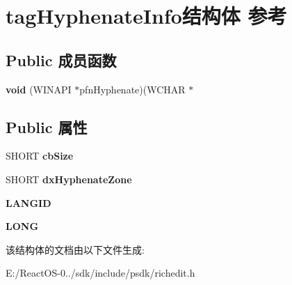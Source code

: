 \hypertarget{structtag_hyphenate_info}{}\section{tag\+Hyphenate\+Info结构体 参考}
\label{structtag_hyphenate_info}
\subsection*{Public 成员函数}
\begin{DoxyCompactItemize}
\item 
\mbox{\label{structtag_hyphenate_info_a446b2d0370636a5185f847633440c113}} 
{\bfseries void} (W\+I\+N\+A\+PI $\ast$pfn\+Hyphenate)(W\+C\+H\+AR $\ast$
\end{DoxyCompactItemize}
\subsection*{Public 属性}
\begin{DoxyCompactItemize}
\item 
\mbox{\label{structtag_hyphenate_info_af9e518d96f32a74b767697b2a63eb75a}} 
S\+H\+O\+RT {\bfseries cb\+Size}
\item 
\mbox{\label{structtag_hyphenate_info_af2c43cf1932f407ca3f54fb413106a90}} 
S\+H\+O\+RT {\bfseries dx\+Hyphenate\+Zone}
\item 
\mbox{\label{structtag_hyphenate_info_a226b6c15e3034722b476f8e11780d648}} 
{\bfseries L\+A\+N\+G\+ID}
\item 
\mbox{\label{structtag_hyphenate_info_aeaf50d044cc7b4416a1f9a8679337525}} 
{\bfseries L\+O\+NG}
\end{DoxyCompactItemize}


该结构体的文档由以下文件生成\+:\begin{DoxyCompactItemize}
\item 
E\+:/\+React\+O\+S-\/0../sdk/include/psdk/richedit.\+h\end{DoxyCompactItemize}
